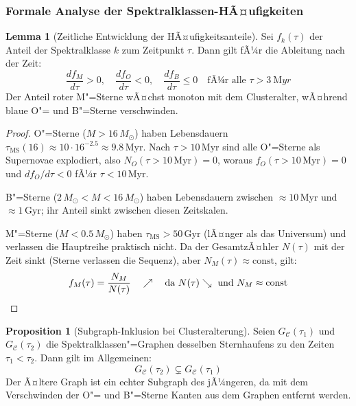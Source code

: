 ﻿\documentclass[a4paper,12pt]{article}
\theoremstyle{definition}
\newtheorem{lemma}{Lemma}
\newtheorem{proposition}{Proposition}
\begin{document}
\subsubsection{Formale Analyse der Spektralklassen-HÃ¤ufigkeiten}

\begin{lemma}[Zeitliche Entwicklung der HÃ¤ufigkeitsanteile]
\label{lem:frakevol}
    Sei $f_k(\tau)$ der Anteil der Spektralklasse $k$ zum Zeitpunkt $\tau$.
    Dann gilt fÃ¼r die Ableitung nach der Zeit:
    \[
        \frac{df_M}{d\tau} > 0, \quad
        \frac{df_O}{d\tau} < 0, \quad
        \frac{df_B}{d\tau} \leq 0
        \quad \text{fÃ¼r alle } \tau > \SI{3}{\mega yr}
    \]
    Der Anteil roter M"=Sterne wÃ¤chst monoton mit dem Clusteralter,
    wÃ¤hrend blaue O"= und B"=Sterne verschwinden.
\end{lemma}

\begin{proof}
    O"=Sterne ($M > 16\,M_\odot$) haben Lebensdauern
    $\tau_{\text{MS}}(16) \approx 10 \cdot 16^{-2.5} \approx 9.8\,\text{Myr}$.
    Nach $\tau > 10\,\text{Myr}$ sind alle O"=Sterne als Supernovae
    explodiert, also $N_O(\tau > 10\,\text{Myr}) = 0$, woraus
    $f_O(\tau > 10\,\text{Myr}) = 0$ und $df_O/d\tau < 0$
    fÃ¼r $\tau < 10\,\text{Myr}$.

    B"=Sterne ($2\,M_\odot < M < 16\,M_\odot$) haben Lebensdauern
    zwischen $\approx 10\,\text{Myr}$ und $\approx 1\,\text{Gyr}$;
    ihr Anteil sinkt zwischen diesen Zeitskalen.

    M"=Sterne ($M < 0.5\,M_\odot$) haben $\tau_{\text{MS}} > 50\,\text{Gyr}$
    (lÃ¤nger als das Universum) und verlassen die Hauptreihe praktisch nicht.
    Da der GesamtzÃ¤hler $N(\tau)$ mit der Zeit sinkt (Sterne verlassen
    die Sequenz), aber $N_M(\tau) \approx \text{const}$, gilt:
    \[
        f_M(\tau) = \frac{N_M}{N(\tau)} \quad \nearrow \quad
        \text{da } N(\tau) \searrow \text{ und } N_M \approx \text{const} \qedhere
    \]
\end{proof}

\begin{proposition}[Subgraph-Inklusion bei Clusteralterung]
\label{prop:inklusion}
    Seien $G_{\mathcal{C}}(\tau_1)$ und $G_{\mathcal{C}}(\tau_2)$ die
    Spektralklassen"=Graphen desselben Sternhaufens zu den Zeiten
    $\tau_1 < \tau_2$. Dann gilt im Allgemeinen:
    \[
        G_{\mathcal{C}}(\tau_2) \subsetneq G_{\mathcal{C}}(\tau_1)
    \]
    Der Ã¤ltere Graph ist ein echter Subgraph des jÃ¼ngeren, da mit dem
    Verschwinden der O"= und B"=Sterne Kanten aus dem Graphen entfernt werden.
\end{proposition}
\end{document}
